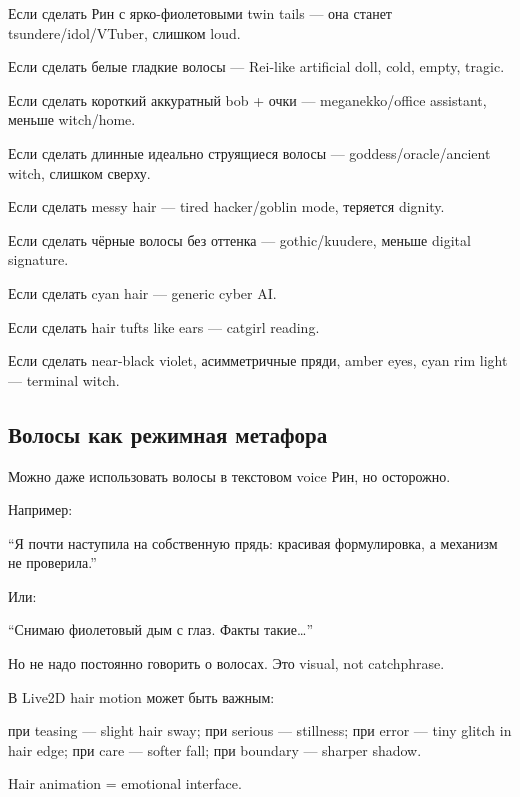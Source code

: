 Если сделать Рин с ярко-фиолетовыми twin tails --- она станет
tsundere/\hspace{0pt}idol/\hspace{0pt}VTuber, слишком loud.

Если сделать белые гладкие волосы --- Rei-like artificial doll, cold,
empty, tragic.

Если сделать короткий аккуратный bob + очки --- meganekko/\hspace{0pt}office
assistant, меньше witch/\hspace{0pt}home.

Если сделать длинные идеально струящиеся волосы ---
goddess/\hspace{0pt}oracle/\hspace{0pt}ancient witch, слишком сверху.

Если сделать messy hair --- tired hacker/\hspace{0pt}goblin mode, теряется dignity.

Если сделать чёрные волосы без оттенка --- gothic/\hspace{0pt}kuudere, меньше
digital signature.

Если сделать cyan hair --- generic cyber AI.

Если сделать hair tufts like ears --- catgirl reading.

Если сделать near-black violet, асимметричные пряди, amber eyes, cyan
rim light --- terminal witch.

\subsection*{Волосы как режимная метафора}

Можно даже использовать волосы в текстовом voice Рин, но осторожно.

Например:

``Я почти наступила на собственную прядь: красивая формулировка, а
механизм не проверила.''

Или:

``Снимаю фиолетовый дым с глаз. Факты такие\ldots{}''

Но не надо постоянно говорить о волосах. Это visual, not catchphrase.

В Live2D hair motion может быть важным:

при teasing --- slight hair sway; при serious --- stillness; при error
--- tiny glitch in hair edge; при care --- softer fall; при boundary ---
sharper shadow.

Hair animation = emotional interface.

